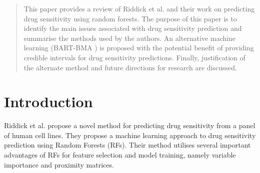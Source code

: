 \documentclass[journal]{IEEEtran}
\begin{document}




\maketitle









%
\IEEEpeerreviewmaketitle

\begin{abstract}
	This paper provides a review of Riddick et al. \cite{riddick2011predicting} and their work on predicting drug sensitivity using random forests. The purpose of this paper is to identify the main issues associated with drug sensitivity prediction and summarise the methods used by the authors. An alternative machine learning (BART-BMA \cite{hernandez2015bayesian}) is proposed with the potential benefit of providing credible intervals for drug sensitivity predictions. Finally, justification of the alternate method and future directions for research are discussed.
\end{abstract}

\section{Introduction}
Riddick et al. \cite{riddick2011predicting} propose a novel method for predicting drug sensitivity from a panel of human cell lines. They propose a machine learning approach to drug sensitivity prediction using Random Forests (RFs). Their method utilises several important advantages of RFs for feature selection and model training, namely variable importance and proximity matrices. 
\end{document}
